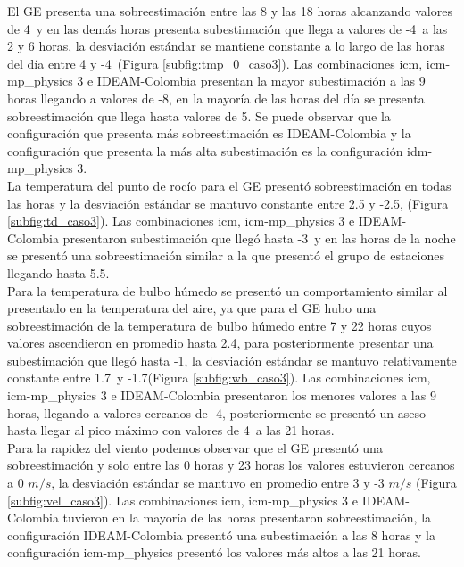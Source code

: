 
El GE presenta una sobreestimación entre las 8 y las 18 horas alcanzando valores de 4\celc\ y en las demás horas presenta subestimación que llega a valores de -4\celc\ a las 2 y 6 horas, la desviación estándar se mantiene constante a lo largo de las horas del día entre 4 y -4\celsius\ (Figura \ref{subfig:tmp_0_caso3}). Las combinaciones icm, icm-mp\_physics 3 e IDEAM-Colombia presentan la mayor subestimación a las 9 horas llegando a valores de -8\celc, en la mayoría de las horas del día se presenta sobreestimación que llega hasta valores de 5\celc. Se puede observar que la configuración que presenta más sobreestimación es IDEAM-Colombia y la configuración que presenta la más alta subestimación es la configuración idm-mp\_physics 3.\\


La temperatura del punto de rocío para el GE presentó sobreestimación en todas las horas y la desviación estándar se mantuvo constante entre 2.5 y -2.5\celsius, (Figura \ref{subfig:td_caso3}). Las combinaciones icm, icm-mp\_physics 3 e IDEAM-Colombia presentaron subestimación que llegó hasta -3\celc\ y en las horas de la noche se presentó una sobreestimación similar a la que presentó el grupo de estaciones llegando hasta 5.5\celc.\\

Para la temperatura de bulbo húmedo se presentó un comportamiento similar al presentado en la temperatura del aire, ya que para el GE hubo una sobreestimación de la temperatura de bulbo húmedo entre 7 y 22 horas cuyos valores ascendieron en promedio hasta 2.4\celsius, para posteriormente presentar una subestimación que llegó hasta -1\celsius, la desviación estándar se mantuvo relativamente constante entre 1.7\celc\ y -1.7\celc (Figura \ref{subfig:wb_caso3}). Las combinaciones icm, icm-mp\_physics 3 e IDEAM-Colombia presentaron los menores valores a las 9 horas, llegando a valores cercanos de -4\celsius, posteriormente se presentó un aseso hasta llegar al pico máximo con valores de 4\celsius\ a las 21 horas.\\

Para la rapidez del viento podemos observar que el GE presentó una sobreestimación y solo entre las 0 horas y 23 horas los valores estuvieron cercanos a 0 $m/s$, la desviación estándar se mantuvo en promedio entre 3 y -3 $m/s$ (Figura \ref{subfig:vel_caso3}). Las combinaciones icm, icm-mp\_physics 3 e IDEAM-Colombia tuvieron en la mayoría de las horas presentaron sobreestimación, la configuración IDEAM-Colombia presentó una subestimación a las 8 horas y la configuración icm-mp\_physics presentó los valores más altos a las 21 horas.\\


